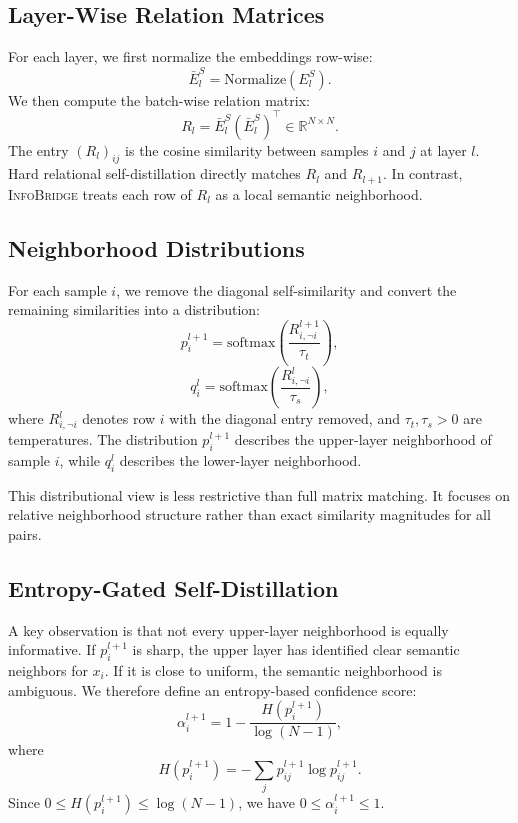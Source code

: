 \documentclass[letterpaper]{article}
\begin{document}
\subsection{Layer-Wise Relation Matrices}

For each layer, we first normalize the embeddings row-wise:
\begin{equation}
    \bar{E}_l^S = \mathrm{Normalize}(E_l^S).
\end{equation}
We then compute the batch-wise relation matrix:
\begin{equation}
    R_l = \bar{E}_l^S(\bar{E}_l^S)^\top \in \mathbb{R}^{N\times N}.
\end{equation}
The entry $(R_l)_{ij}$ is the cosine similarity between samples $i$ and $j$ at layer $l$. Hard relational self-distillation directly matches $R_l$ and $R_{l+1}$. In contrast, \textsc{InfoBridge} treats each row of $R_l$ as a local semantic neighborhood.

\subsection{Neighborhood Distributions}

For each sample $i$, we remove the diagonal self-similarity and convert the remaining similarities into a distribution:
\begin{equation}
    p_i^{l+1}
    =
    \mathrm{softmax}\left(\frac{R_{i,\neg i}^{l+1}}{\tau_t}\right),
\end{equation}
\begin{equation}
    q_i^l
    =
    \mathrm{softmax}\left(\frac{R_{i,\neg i}^{l}}{\tau_s}\right),
\end{equation}
where $R_{i,\neg i}^{l}$ denotes row $i$ with the diagonal entry removed, and $\tau_t,\tau_s>0$ are temperatures. The distribution $p_i^{l+1}$ describes the upper-layer neighborhood of sample $i$, while $q_i^l$ describes the lower-layer neighborhood.

This distributional view is less restrictive than full matrix matching. It focuses on relative neighborhood structure rather than exact similarity magnitudes for all pairs.

\subsection{Entropy-Gated Self-Distillation}

A key observation is that not every upper-layer neighborhood is equally informative. If $p_i^{l+1}$ is sharp, the upper layer has identified clear semantic neighbors for $x_i$. If it is close to uniform, the semantic neighborhood is ambiguous. We therefore define an entropy-based confidence score:
\begin{equation}
    \alpha_i^{l+1}
    =
    1-\frac{H(p_i^{l+1})}{\log(N-1)},
\end{equation}
where
\begin{equation}
    H(p_i^{l+1})=-\sum_j p_{ij}^{l+1}\log p_{ij}^{l+1}.
\end{equation}
Since $0\leq H(p_i^{l+1})\leq \log(N-1)$, we have $0\leq \alpha_i^{l+1}\leq 1$.
\end{document}
